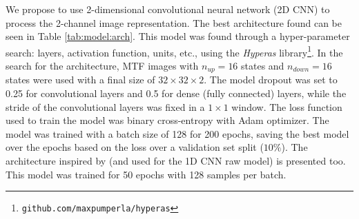 We propose to use 2-dimensional convolutional neural network (2D CNN) to process the 2-channel image representation. The best architecture found can be seen in Table \ref{tab:model:arch}. This model was found through a hyper-parameter search: layers, activation function, units, etc., using the \textit{Hyperas} library\footnote{\texttt{github.com/maxpumperla/hyperas}}. 
In the search for the architecture, MTF images with $n_{up}=16$ states and $n_{down}=16$ states were used with a final size of $32 \times 32 \times 2$.
The model dropout was set to 0.25 for convolutional layers and 0.5 for dense (fully connected) layers, while the stride of the convolutional layers was fixed in a $1\times1$ window. 
The loss function used to train the model was binary cross-entropy with Adam optimizer. 
The model was trained with a batch size of 128 for 200 epochs, saving the best model over the epochs based on the loss over a validation set split ($10\%$). 
The architecture inspired by \citep{shallue2018identifying} (and used for the 1D CNN raw model) is presented too. This model was trained for 50 epochs with 128 samples per batch.
